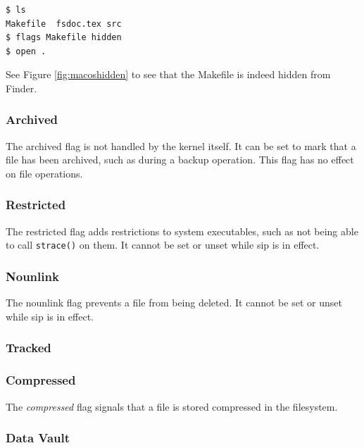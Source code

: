 \documentclass[a4paper]{article}
\begin{document}
\begin{verbatim}
$ ls
Makefile  fsdoc.tex src
$ flags Makefile hidden
$ open .
\end{verbatim}
See Figure \ref{fig:macoshidden} to see that the Makefile is indeed hidden from Finder.

\subsubsection{Archived}

The archived flag is not handled by the kernel itself. It can be set to mark that a file has been archived, such as during a backup operation. This flag has no effect on file operations.

\subsubsection{Restricted}

The restricted flag adds restrictions to system executables, such as not being able to call \verb|strace()| on them. It cannot be set or unset while \gls{sip} is in effect.

\subsubsection{Nounlink}

The nounlink flag prevents a file from being deleted. It cannot be set or unset while \gls{sip} is in effect.

\subsubsection{Tracked}


\subsubsection{Compressed}

The \emph{compressed} flag signals that a file is stored compressed in the filesystem.

\subsubsection{Data Vault}

\end{document}
